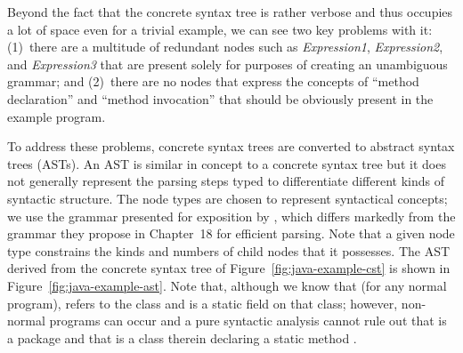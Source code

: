 Beyond the fact that the concrete syntax tree is rather verbose and thus occupies a lot of space even for a trivial example, we can see two key problems with it: (1)~there are a multitude of redundant nodes such as \textit{Expression1}, \textit{Expression2}, and \textit{Expression3} that are present solely for purposes of creating an unambiguous grammar; and (2)~there are no nodes that express the concepts of ``method declaration'' and ``method invocation'' that should be obviously present in the example program.

To address these problems, concrete syntax trees are converted to abstract syntax trees (ASTs). An AST is similar in concept to a concrete syntax tree but it does not generally represent the parsing steps typed to differentiate different kinds of syntactic structure.  The node types are chosen to represent syntactical concepts; we use the grammar presented for exposition by \citet{2012:book:gosling}, which differs markedly from the grammar they propose in Chapter~18 for efficient parsing. Note that a given node type constrains the kinds and numbers of child nodes that it possesses.  The AST derived from the concrete syntax tree of Figure~\ref{fig:java-example-cst} is shown in Figure~\ref{fig:java-example-ast}.  Note that, although we know that (for any normal program),  refers to the class  and  is a static field on that class; however, non-normal programs can occur and a pure syntactic analysis cannot rule out that  is a package and that  is a class therein declaring a static method .

